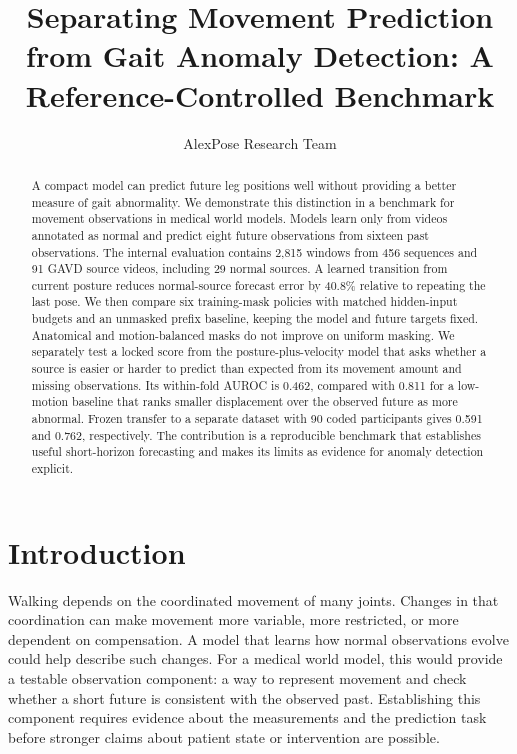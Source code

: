 \documentclass[letterpaper]{article}
\title{Separating Movement Prediction from Gait Anomaly Detection: A Reference-Controlled Benchmark}
\author{AlexPose Research Team}
\begin{document}
\maketitle

\begin{abstract}

A compact model can predict future leg positions well without providing a better measure of gait abnormality. We demonstrate this distinction in a benchmark for movement observations in medical world models. Models learn only from videos annotated as normal and predict eight future observations from sixteen past observations. The internal evaluation contains 2,815 windows from 456 sequences and 91 GAVD source videos, including 29 normal sources. A learned transition from current posture reduces normal-source forecast error by 40.8\% relative to repeating the last pose. We then compare six training-mask policies with matched hidden-input budgets and an unmasked prefix baseline, keeping the model and future targets fixed. Anatomical and motion-balanced masks do not improve on uniform masking. We separately test a locked score from the posture-plus-velocity model that asks whether a source is easier or harder to predict than expected from its movement amount and missing observations. Its within-fold AUROC is 0.462, compared with 0.811 for a low-motion baseline that ranks smaller displacement over the observed future as more abnormal. Frozen transfer to a separate dataset with 90 coded participants gives 0.591 and 0.762, respectively. The contribution is a reproducible benchmark that establishes useful short-horizon forecasting and makes its limits as evidence for anomaly detection explicit.

\end{abstract}

\section{Introduction}

Walking depends on the coordinated movement of many joints. Changes in that coordination can make movement more variable, more restricted, or more dependent on compensation. A model that learns how normal observations evolve could help describe such changes. For a medical world model, this would provide a testable observation component: a way to represent movement and check whether a short future is consistent with the observed past. Establishing this component requires evidence about the measurements and the prediction task before stronger claims about patient state or intervention are possible.
\end{document}

